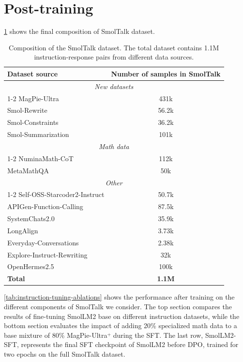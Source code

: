 \documentclass{article}
\theoremstyle{plain}
\theoremstyle{definition}
\theoremstyle{remark}
\begin{document}
\section{Post-training}
\label{app:post-training}

\cref{tab:smoltalk_composition} shows the final composition of SmolTalk dataset.
\begin{table}[h!]
\centering
\caption{Composition of the SmolTalk dataset. The total dataset contains 1.1M instruction-response pairs from different data sources.}
\label{tab:smoltalk_composition}
\begin{tabular}{@{}lc@{}}
\toprule
\textbf{Dataset source} & \textbf{Number of samples in SmolTalk} \\ \midrule
\multicolumn{2}{c}{\textit{New datasets}} \\
\cmidrule{1-2}
MagPie-Ultra & 431k \\
Smol-Rewrite & 56.2k \\
Smol-Constraints & 36.2k \\
Smol-Summarization & 101k \\
\midrule
\multicolumn{2}{c}{\textit{Math data}}\\
\cmidrule{1-2}
NuminaMath-CoT & 112k \\
MetaMathQA & 50k \\
\midrule
\multicolumn{2}{c}{\textit{Other}} \\
\cmidrule{1-2}
Self-OSS-Starcoder2-Instruct & 50.7k \\
APIGen-Function-Calling & 87.5k \\
SystemChats2.0 & 35.9k \\
LongAlign & 3.73k \\
Everyday-Conversations & 2.38k \\
Explore-Instruct-Rewriting & 32k \\
OpenHermes2.5 & 100k \\ \midrule
\textbf{Total} & \textbf{1.1M} \\ \bottomrule
\end{tabular}
\end{table}

\cref{tab:instruction-tuning-ablations} shows the performance after training on the different components of SmolTalk we consider. The top section compares the results of fine-tuning SmolLM2 base on different instruction datasets, while the bottom section evaluates the impact of adding 20\% specialized math data to a base mixture of 80\% MagPie-Ultra$\overset{+}{}$ during the SFT. The last row, SmolLM2-SFT, represents the final SFT checkpoint of SmolLM2 before DPO, trained for two epochs on the full SmolTalk dataset.
\end{document}
